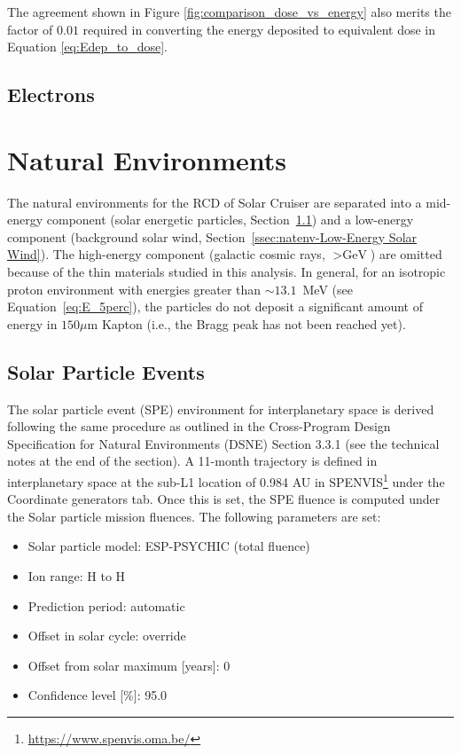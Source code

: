 \documentclass{hitec}
\begin{document}
The agreement shown in Figure \ref{fig:comparison_dose_vs_energy} also merits the factor of $0.01$ required in converting the energy deposited to equivalent dose in Equation \eqref{eq:Edep_to_dose}.


\subsection{Electrons}



\clearpage %
\section{Natural Environments}
\label{sec:Natural Environment}

The natural environments for the RCD of Solar Cruiser are separated into a mid-energy component (solar energetic particles, Section~\ref{ssec:natenv-Solar Particle Events}) and a low-energy component (background solar wind, Section~\ref{ssec:natenv-Low-Energy Solar Wind}). The high-energy component (galactic cosmic rays, $> \text{GeV}$) are omitted because of the thin materials studied in this analysis. In general, for an isotropic proton environment with energies greater than $\sim 13.1$~MeV (see Equation~\eqref{eq:E_5perc}), the particles do not deposit a significant amount of energy in $150 \mu$m Kapton (i.e., the Bragg peak has not been reached yet).


\subsection{Solar Particle Events}
\label{ssec:natenv-Solar Particle Events}

The solar particle event (SPE) environment for interplanetary space is derived following the same procedure as outlined in the Cross-Program Design Specification for Natural Environments (DSNE) Section 3.3.1 (see the technical notes at the end of the section). A 11-month trajectory is defined in interplanetary space at the sub-L1 location of 0.984 AU in SPENVIS\footnote{\url{https://www.spenvis.oma.be/}} under the \textsf{Coordinate generators} tab. Once this is set, the SPE fluence is computed under the \textsf{Solar particle mission fluences}. The following parameters are set:
\begin{itemize}
	\item Solar particle model: ESP-PSYCHIC (total fluence)
	\item Ion range: H to H
	\item Prediction period: automatic
	\item Offset in solar cycle: override
	\item Offset from solar maximum [years]: 0
	\item Confidence level [\%]: 95.0
\end{itemize}
\end{document}
